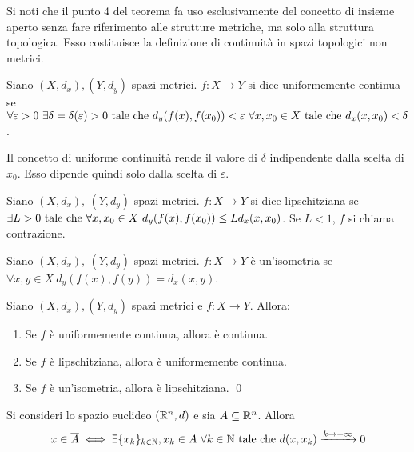 \begin{remark}
    Si noti che il punto 4 del teorema fa uso esclusivamente del concetto di insieme aperto senza fare riferimento alle strutture metriche, ma solo alla struttura topologica. Esso costituisce la definizione di continuità in spazi topologici non metrici.
\end{remark}

\begin{definition}
    Siano $(X, d_x), (Y, d_y)$ spazi metrici. $f : X \to Y$ si dice uniformemente continua se $\forall \varepsilon > 0 \ \exists \delta = \delta (\varepsilon) > 0 \text{ tale che } d_y(f(x), f(x_0)) < \varepsilon \ \forall x,x_0 \in X \text{ tale che } d_x(x, x_0) < \delta$.
\end{definition}

\begin{remark}
    Il concetto di uniforme continuità rende il valore di $\delta$ indipendente dalla scelta di $x_0$. Esso dipende quindi solo dalla scelta di $\varepsilon$.
\end{remark}

\begin{definition}
    Siano $(X, d_x),\ (Y, d_y)$ spazi metrici. $f: X \to Y$ si dice lipschitziana se $\exists L > 0 \text{ tale che } \forall x, x_0 \in X \ d_y(f(x), f(x_0)) \leq Ld_x(x, x_0)$. Se $L<1$, $f$ si chiama contrazione.
\end{definition}

\begin{definition}
    [Isometria]
    Siano $(X, d_x),\ (Y, d_y)$ spazi metrici. $f: X \to Y$ è un'isometria se $\forall x, y \in X \ d_y(f(x), f(y)) = d_x(x,y)$.
\end{definition}

\begin{theorem}
    Siano $(X, d_x), (Y, d_y)$ spazi metrici e $f:X \to Y$. Allora:
    \begin{enumerate}
        \item Se $f$ è uniformemente continua, allora è continua.
        \item Se $f$ è lipschitziana, allora è uniformemente continua.
        \item Se $f$ è un'isometria, allora è lipschitziana.
        \qed
    \end{enumerate}
\end{theorem}

\begin{theorem}
    Si consideri lo spazio euclideo $(\mathbb{R}^n,d)$ e sia $A \subseteq \mathbb{R}^n$. Allora
    $$
        x \in \overline{A} \iff \exists \{x_k\}_{k\in \mathbb{N}}, x_k \in A \ \forall k \in \mathbb{N} \text{ tale che } d(x, x_k) \xrightarrow{k \to + \infty} 0
    $$
\end{theorem}

